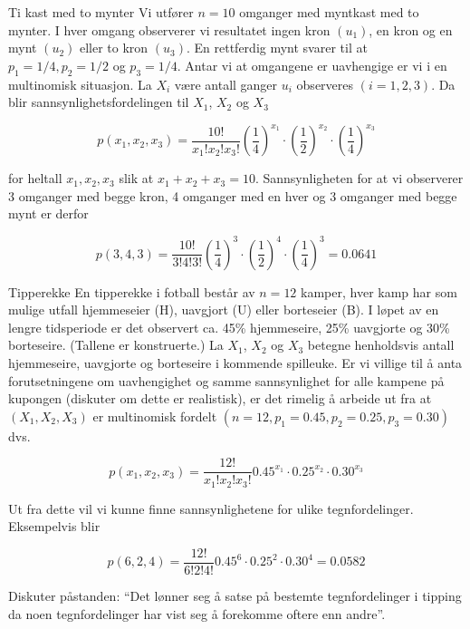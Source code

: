 \begin{eksempel}{Ti kast med to mynter}
Vi utfører $n=10$ omganger med myntkast med to mynter. I hver
omgang observerer vi resultatet ingen kron $(u_1)$, en kron og en
mynt $(u_2)$ eller to kron $(u_3)$. En rettferdig mynt svarer til
at $p_1=1/4, p_2=1/2$ og $p_3=1/4$. Antar vi at omgangene er
uavhengige er vi i en multinomisk situasjon. La $X_i$ være antall
ganger $u_i$ observeres $(i=1,2,3)$. Da blir
sannsynlighetsfordelingen til $X_1$, $X_2$ og $X_3$

\[ p(x_1,x_2,x_3)=\frac{10!}{x_1!x_2!x_3!}
 {(\frac{1}{4})}^{x_1}\cdot {(\frac{1}{2})}^{x_2}\cdot {(\frac{1}{4})}^{x_3}\]

\noindent for heltall $x_1, x_2, x_3$ slik at $x_1+x_2+x_3=10$.
Sannsynligheten for at vi observerer 3 omganger med begge kron, 4
omganger med en hver og 3 omganger med begge mynt er derfor

\[ p(3,4,3)=\frac{10!}{3!4!3!}
      {(\frac{1}{4})}^3\cdot {(\frac{1}{2})}^4\cdot {(\frac{1}{4})}^3=0.0641\]
\end{eksempel}

\begin{eksempel}{Tipperekke}
En tipperekke i fotball består av $n=12$ kamper, hver kamp har
som mulige utfall hjemmeseier (H), uavgjort (U) eller borteseier
(B). I løpet av en lengre tidsperiode er det observert ca. 45\%
hjemmeseire, 25\% uavgjorte og 30\% borteseire. (Tallene er
konstruerte.) La $X_1$, $X_2$ og $X_3$ betegne henholdsvis antall
hjemmeseire, uavgjorte og borteseire i kommende spilleuke. Er vi
villige til å anta forutsetningene om uavhengighet og samme
sannsynlighet for alle kampene på kupongen (diskuter om dette er
realistisk), er det rimelig å arbeide ut fra at $(X_1, X_2, X_3)$
er multinomisk fordelt $(n=12, p_1=0.45, p_2=0.25, p_3=0.30)$
dvs. 

\[ p(x_1,x_2,x_3)=\frac{12!}{x_1!x_2!x_3!}0.45^{x_1}\cdot 0.25^{x_2}\cdot 
                                                     0.30^{x_3}       \]

\noindent Ut fra dette vil vi kunne finne sannsynlighetene for ulike
tegnfordelinger. Eksempelvis blir

\[ p(6,2,4)=\frac{12!}{6!2!4!}0.45^6\cdot 0.25^2\cdot 0.30^4=0.0582 \]
                            
\noindent Diskuter påstanden: ``Det lønner seg å satse på
 bestemte tegnfordelinger i tipping da noen tegnfordelinger har vist seg å
forekomme oftere enn andre''.
\end{eksempel}

